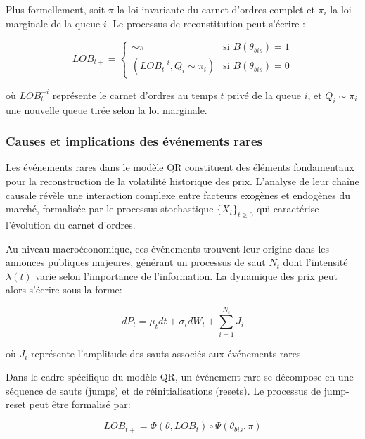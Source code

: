\documentclass[12pt,a4paper]{article}
\theoremstyle{definition}
\theoremstyle{remark}
\begin{document}
Plus formellement, soit $\pi$ la loi invariante du carnet d'ordres complet et $\pi_i$ la loi marginale de la queue $i$. Le processus de reconstitution peut s'écrire :

\begin{equation}
    LOB_{t+} = \begin{cases}
        \sim \pi & \text{si } B(\theta_{bis}) = 1 \\
        (LOB_t^{-i}, Q_i \sim \pi_i) & \text{si } B(\theta_{bis}) = 0
    \end{cases}
\end{equation}

où $LOB_t^{-i}$ représente le carnet d'ordres au temps $t$ privé de la queue $i$, et $Q_i \sim \pi_i$ une nouvelle queue tirée selon la loi marginale.



\subsubsection{Causes et implications des événements rares}

Les événements rares dans le modèle QR constituent des éléments fondamentaux pour la reconstruction de la volatilité historique des prix. L'analyse de leur chaîne causale révèle une interaction complexe entre facteurs exogènes et endogènes du marché, formalisée par le processus stochastique $\{X_t\}_{t\geq 0}$ qui caractérise l'évolution du carnet d'ordres.

Au niveau macroéconomique, ces événements trouvent leur origine dans les annonces publiques majeures, générant un processus de saut $N_t$ dont l'intensité $\lambda(t)$ varie selon l'importance de l'information. La dynamique des prix peut alors s'écrire sous la forme:

\begin{equation}
dP_t = \mu_t dt + \sigma_t dW_t + \sum_{i=1}^{N_t} J_i
\end{equation}

où $J_i$ représente l'amplitude des sauts associés aux événements rares.

Dans le cadre spécifique du modèle QR, un événement rare se décompose en une séquence de sauts (jumps) et de réinitialisations (resets). Le processus de jump-reset peut être formalisé par:

\begin{equation}
LOB_{t+} = \Phi(\theta, LOB_t) \circ \Psi(\theta_{bis}, \pi)
\end{equation}
\end{document}
